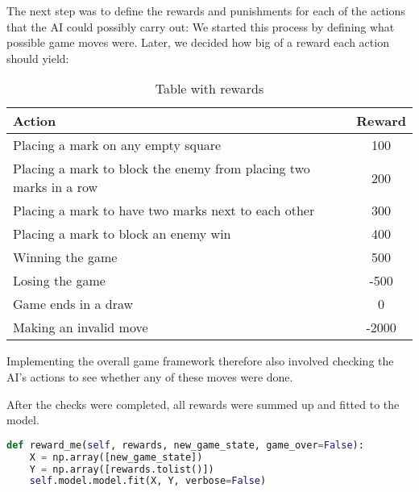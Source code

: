 The next step was to define the rewards and punishments for each of the actions that the AI could possibly carry out: We started this process by defining what possible game moves were. Later, we decided how big of a reward each action should yield:

\begin{table}[H]
	\begin{tabular}{|l|c|}\hline
		Action & Reward \\ \hline \hline
		Placing a mark on any empty square & 100 \\ \hline
		Placing a mark to block the enemy from placing two marks in a row & 200 \\ \hline
		Placing a mark to have two marks next to each other & 300 \\ \hline
		Placing a mark to block an enemy win & 400 \\ \hline
		Winning the game & 500 \\ \hline
		Losing the game & -500 \\ \hline
		Game ends in a draw & 0 \\ \hline
		Making an invalid move & -2000 \\ \hline
	\end{tabular}
	\caption{Table with rewards}
	\label{tablRewards}
\end{table}
Implementing the overall game framework therefore also involved checking the AI's actions to see whether any of these moves were done.

After the checks were completed, all rewards were summed up and fitted to the model.
\begin{lstlisting}[frame=single,language=Python,caption={Method of },captionpos=b]
def reward_me(self, rewards, new_game_state, game_over=False):
    X = np.array([new_game_state])
    Y = np.array([rewards.tolist()])
    self.model.model.fit(X, Y, verbose=False)
\end{lstlisting}

